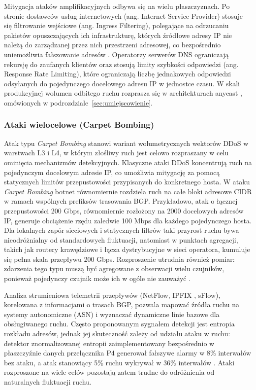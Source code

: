 \documentclass[a4paper,12pt]{article}
\begin{document}
Mitygacja ataków amplifikacyjnych odbywa się na wielu płaszczyznach. Po stronie dostawców usług internetowych (ang. Internet Service Provider) stosuje się filtrowanie wejściowe (ang. Ingress Filtering), polegające na odrzucaniu pakietów opuszczających ich infrastrukturę, których źródłowe adresy IP nie należą do zarządzanej przez nich przestrzeni adresowej, co bezpośrednio uniemożliwia fałszowanie adresów \cite{rfc2827}. Operatorzy serwerów DNS ograniczają rekursję do zaufanych klientów \cite{rfc5358} oraz stosują limity szybkości odpowiedzi (ang. Response Rate Limiting), które ograniczają liczbę jednakowych odpowiedzi odsyłanych do pojedynczego docelowego adresu IP w jednostce czasu. W skali produkcyjnej wolumen odbitego ruchu rozprasza się w architekturach anycast \cite{rfc4786,rizvi2022anycast}, omówionych w podrozdziale~\ref{sec:umiejscowienie}.
\subsubsection{Ataki wielocelowe (Carpet Bombing)}
Atak typu \textit{Carpet Bombing} stanowi wariant wolumetrycznych wektorów DDoS w warstwach L3 i L4, w którym złośliwy ruch jest celowo rozpraszany w celu ominięcia mechanizmów detekcyjnych. Klasyczne ataki DDoS koncentrują ruch na pojedynczym docelowym adresie IP, co umożliwia mitygację za pomocą statycznych limitów przepustowości przypisanych do konkretnego hosta. W ataku \textit{Carpet Bombing} botnet równomiernie rozdziela ruch na całe bloki adresowe CIDR w ramach wspólnych prefiksów trasowania BGP. Przykładowo, atak o łącznej przepustowości 200 Gbps, równomiernie rozłożony na 2000 docelowych adresów IP, generuje obciążenie rzędu zaledwie 100 Mbps dla każdego pojedynczego hosta. Dla lokalnych zapór sieciowych i statycznych filtrów taki przyrost ruchu bywa nieodróżnialny od standardowych fluktuacji, natomiast w punktach agregacji, takich jak routery krawędziowe i łącza dystrybucyjne w sieci operatora, kumuluje się pełna skala przepływu 200 Gbps. Rozproszenie utrudnia również pomiar: zdarzenia tego typu muszą być agregowane z obserwacji wielu czujników, ponieważ pojedynczy czujnik może ich w ogóle nie zauważyć \cite{hiesgen2024age}.

Analiza strumieniowa telemetrii przepływów (NetFlow, IPFIX \cite{rfc7011}, sFlow), korelowana z informacjami o trasach BGP, pozwala mapować źródła ruchu na systemy autonomiczne (ASN) i wyznaczać dynamiczne linie bazowe dla obsługiwanego ruchu. Często proponowanym sygnałem detekcji jest entropia rozkładu adresów, jednak jej skuteczność zależy od udziału ataku w ruchu: detektor znormalizowanej entropii zaimplementowany bezpośrednio w płaszczyźnie danych przełącznika P4 generował fałszywe alarmy w 8\% interwałów bez ataku, a atak stanowiący 5\% ruchu wykrywał w 36\% interwałów \cite{ding2021tracking}. Ataki rozproszone na wiele celów pozostają zatem trudne do odróżnienia od naturalnych fluktuacji ruchu.
\end{document}
